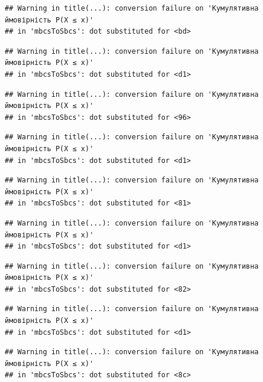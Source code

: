 \documentclass[
  11pt,
]{book}
\begin{document}
\begin{verbatim}
## Warning in title(...): conversion failure on 'Кумулятивна ймовірність P(X ≤ x)'
## in 'mbcsToSbcs': dot substituted for <bd>
\end{verbatim}

\begin{verbatim}
## Warning in title(...): conversion failure on 'Кумулятивна ймовірність P(X ≤ x)'
## in 'mbcsToSbcs': dot substituted for <d1>
\end{verbatim}

\begin{verbatim}
## Warning in title(...): conversion failure on 'Кумулятивна ймовірність P(X ≤ x)'
## in 'mbcsToSbcs': dot substituted for <96>
\end{verbatim}

\begin{verbatim}
## Warning in title(...): conversion failure on 'Кумулятивна ймовірність P(X ≤ x)'
## in 'mbcsToSbcs': dot substituted for <d1>
\end{verbatim}

\begin{verbatim}
## Warning in title(...): conversion failure on 'Кумулятивна ймовірність P(X ≤ x)'
## in 'mbcsToSbcs': dot substituted for <81>
\end{verbatim}

\begin{verbatim}
## Warning in title(...): conversion failure on 'Кумулятивна ймовірність P(X ≤ x)'
## in 'mbcsToSbcs': dot substituted for <d1>
\end{verbatim}

\begin{verbatim}
## Warning in title(...): conversion failure on 'Кумулятивна ймовірність P(X ≤ x)'
## in 'mbcsToSbcs': dot substituted for <82>
\end{verbatim}

\begin{verbatim}
## Warning in title(...): conversion failure on 'Кумулятивна ймовірність P(X ≤ x)'
## in 'mbcsToSbcs': dot substituted for <d1>
\end{verbatim}

\begin{verbatim}
## Warning in title(...): conversion failure on 'Кумулятивна ймовірність P(X ≤ x)'
## in 'mbcsToSbcs': dot substituted for <8c>
\end{verbatim}
\end{document}
